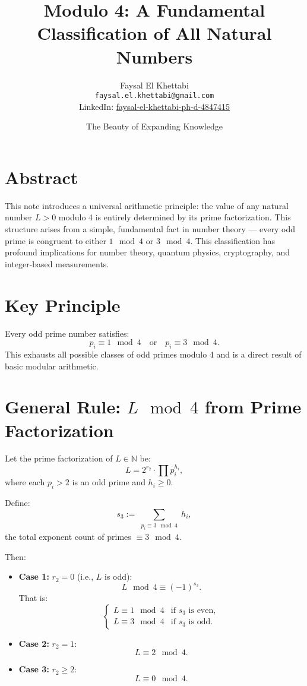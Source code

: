 \documentclass[12pt]{article}
\title{\textbf{Modulo 4: A Fundamental Classification of All Natural Numbers}}
\author{Faysal El Khettabi \\ \small \texttt{faysal.el.khettabi@gmail.com} \\ \small LinkedIn: \href{https://www.linkedin.com/in/faysal-el-khettabi-ph-d-4847415}{faysal-el-khettabi-ph-d-4847415}}
\date{The Beauty of Expanding Knowledge} %
\begin{document}
\maketitle

\section*{Abstract}
This note introduces a universal arithmetic principle: the value of any natural number \( L > 0 \) modulo 4 is entirely determined by its prime factorization. This structure arises from a simple, fundamental fact in number theory — every odd prime is congruent to either \( 1 \mod 4 \) or \( 3 \mod 4 \). This classification has profound implications for number theory, quantum physics, cryptography, and integer-based measurements.

\section*{Key Principle}
Every odd prime number satisfies:
\[
p_i \equiv 1 \mod 4 \quad \text{or} \quad p_i \equiv 3 \mod 4.
\]
This exhausts all possible classes of odd primes modulo 4 and is a direct result of basic modular arithmetic.

\section*{General Rule: \( L \mod 4 \) from Prime Factorization}
Let the prime factorization of \( L \in \mathbb{N} \) be:
\[
L = 2^{r_2} \cdot \prod p_i^{h_i},
\]
where each \( p_i > 2 \) is an odd prime and \( h_i \geq 0 \).

Define:
\[
s_3 := \sum_{\substack{p_i \equiv 3 \mod 4}} h_i,
\]
the total exponent count of primes \( \equiv 3 \mod 4 \).

Then:
\begin{itemize}
    \item \textbf{Case 1:} \( r_2 = 0 \) (i.e., \( L \) is odd):\\
    \[
    L \mod 4 \equiv (-1)^{s_3}.
    \]
    That is:
    \[
    \begin{cases}
    L \equiv 1 \mod 4 & \text{if } s_3 \text{ is even},\\
    L \equiv 3 \mod 4 & \text{if } s_3 \text{ is odd}.
    \end{cases}
    \]

    \item \textbf{Case 2:} \( r_2 = 1 \):\\
    \[
    L \equiv 2 \mod 4.
    \]

    \item \textbf{Case 3:} \( r_2 \geq 2 \):\\
    \[
    L \equiv 0 \mod 4.
    \]
\end{itemize}
\end{document}
